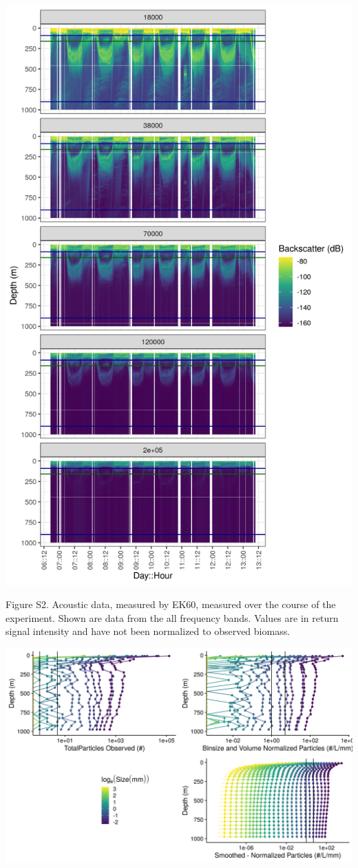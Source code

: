 \documentclass[]{article}
\begin{document}
\includegraphics{../figures/stationP2_EK60_go7.png}

Figure S2. Acoustic data, measured by EK60, measured over the course of
the experiment. Shown are data from the all frequency bands. Values are
in return signal intensity and have not been normalized to observed
biomass.

\includegraphics{../figures/AllParticleSizes.png}
\end{document}
